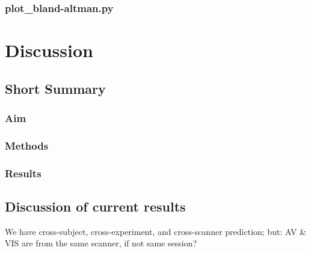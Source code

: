 

\subsubsection{plot\_bland-altman.py}




\section{Discussion}


\subsection{Short Summary}

\subsubsection{Aim}

\subsubsection{Methods}

\subsubsection{Results}


\subsection{Discussion of current results}


We have cross-subject, cross-experiment, and cross-scanner prediction; but:
AV \& VIS are from the same scanner, if not same session?

